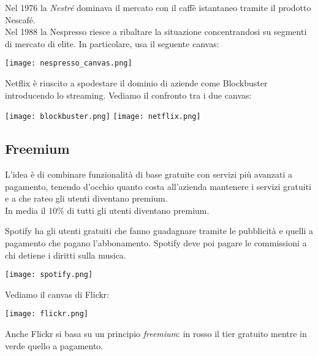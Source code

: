\begin{example}[Nespresso]
	Nel 1976 la \textit{Nestré} dominava il mercato con il caffè istantaneo tramite il prodotto Nescafé. \\
	Nel 1988 la Nespresso riesce a ribaltare la situazione concentrandosi su segmenti di mercato di elite. In particolare, usa il seguente canvas:
	\begin{center}
		\texttt{[image: nespresso\_canvas.png]}
	\end{center}
\end{example}

\newpage
\begin{example}[Netflix]
	Netflix è riuscito a spodestare il dominio di aziende come Blockbuster introducendo lo streaming. Vediamo il confronto tra i due canvas:
	\begin{center}
		\texttt{[image: blockbuster.png]}
		\texttt{[image: netflix.png]}
	\end{center}
\end{example}

\subsection{Freemium}
L'idea è di combinare funzionalità di base gratuite con servizi più avanzati a pagamento, tenendo d'occhio quanto costa all'azienda mantenere i servizi gratuiti e a che rateo gli utenti diventano premium.\\
In media il $10\%$ di tutti gli utenti diventano premium.

\begin{example}[Spotify]
	Spotify ha gli utenti gratuiti che fanno guadagnare tramite le pubblicità e quelli a pagamento che pagano l'abbonamento. Spotify deve poi pagare le commissioni a chi detiene i diritti sulla musica.
	\begin{center}
		\texttt{[image: spotify.png]}
	\end{center}
\end{example}
\newpage
\begin{example}[Flickr]
	Vediamo il canvas di Flickr:
	\begin{center}
		\texttt{[image: flickr.png]}
	\end{center}
	Anche Flickr si basa su un principio \textit{freemium}: in \color{red}rosso \color{black} il tier gratuito mentre in \color{green}verde \color{black} quello a pagamento.
\end{example}

